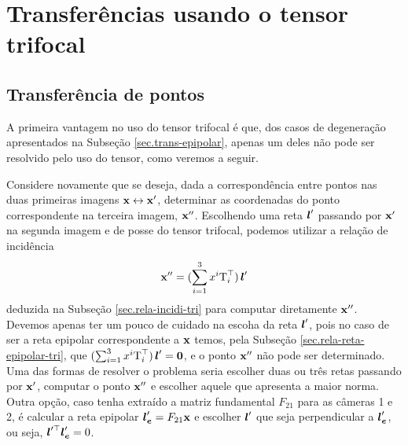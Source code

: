 \section{Transferências usando o tensor trifocal}

\subsection{Transferência de pontos}
A primeira vantagem no uso do tensor trifocal é que, dos casos de degeneração apresentados na Subseção \ref{sec.trans-epipolar}, apenas um deles não pode ser resolvido pelo uso do tensor, como veremos a seguir. 

Considere novamente que se deseja, dada a correspondência entre pontos nas duas primeiras imagens $\mathbf{x}\leftrightarrow\mathbf{x}'$, determinar as coordenadas do ponto correspondente na terceira imagem, $\mathbf{x}''$. Escolhendo uma reta $\boldsymbol{l}'$ passando por $\mathbf{x}'$ na segunda imagem e de posse do tensor trifocal, podemos utilizar a relação de incidência 
\begin{equation}\label{eq.ponto-reta-ponto-isolada}
\mathbf{x}''=(\sum_{i=1}^3 x^i\mbox{T}_i^\top)\,\boldsymbol{l}'
\end{equation} 
deduzida na Subseção \ref{sec.rela-incidi-tri}
para computar diretamente $\mathbf{x}''$. Devemos apenas ter um pouco de cuidado na escoha da reta $\boldsymbol{l}'$, pois no caso de ser a reta epipolar correspondente a $\mathbf{x}$ temos, pela Subseção \ref{sec.rela-reta-epipolar-tri}, que $(\sum_{i=1}^3 x^i\mbox{T}_i^\top)\,\boldsymbol{l}'={\bf 0}$, e o ponto $\mathbf{x}''$ não pode ser determinado. Uma das formas de resolver o problema seria escolher duas ou três retas passando por $\mathbf{x}'$, computar o ponto $\mathbf{x}''$ e escolher aquele que apresenta a maior norma. Outra opção, caso tenha extraído a matriz fundamental $F_{21}$ para as câmeras 1 e 2, é calcular a reta epipolar $\boldsymbol{l}'_{\boldsymbol{e}}=F_{21}\mathbf{x}$ e escolher $\boldsymbol{l}'$ que seja perpendicular a $\boldsymbol{l}'_{\boldsymbol{e}}$, ou seja, $\boldsymbol{l}'^\top\boldsymbol{l}'_{\boldsymbol{e}}=0$. 

